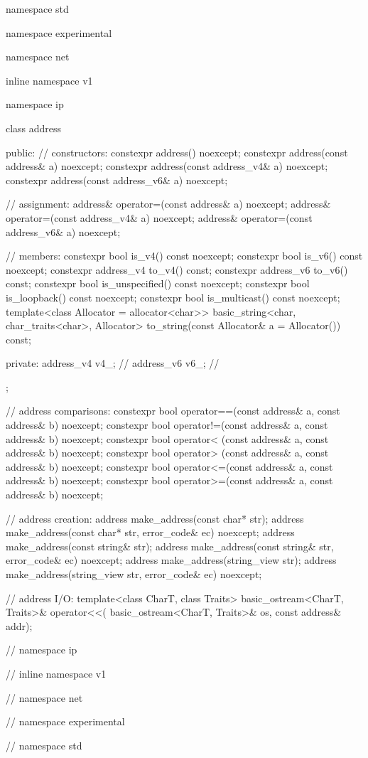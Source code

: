 %
%
%
%
%
%
%
%
%
\begin{codeblock}
namespace std {
namespace experimental {
namespace net {
inline namespace v1 {
namespace ip {

  class address
  {
  public:
    // constructors:
    constexpr address() noexcept;
    constexpr address(const address& a) noexcept;
    constexpr address(const address_v4& a) noexcept;
    constexpr address(const address_v6& a) noexcept;

    // assignment:
    address& operator=(const address& a) noexcept;
    address& operator=(const address_v4& a) noexcept;
    address& operator=(const address_v6& a) noexcept;

    // members:
    constexpr bool is_v4() const noexcept;
    constexpr bool is_v6() const noexcept;
    constexpr address_v4 to_v4() const;
    constexpr address_v6 to_v6() const;
    constexpr bool is_unspecified() const noexcept;
    constexpr bool is_loopback() const noexcept;
    constexpr bool is_multicast() const noexcept;
    template<class Allocator = allocator<char>>
      basic_string<char, char_traits<char>, Allocator>
        to_string(const Allocator& a = Allocator()) const;

  private:
    address_v4 v4_; // \expos
    address_v6 v6_; // \expos
  };

  // address comparisons:
  constexpr bool operator==(const address& a, const address& b) noexcept;
  constexpr bool operator!=(const address& a, const address& b) noexcept;
  constexpr bool operator< (const address& a, const address& b) noexcept;
  constexpr bool operator> (const address& a, const address& b) noexcept;
  constexpr bool operator<=(const address& a, const address& b) noexcept;
  constexpr bool operator>=(const address& a, const address& b) noexcept;

  // address creation:
  address make_address(const char* str);
  address make_address(const char* str, error_code& ec) noexcept;
  address make_address(const string& str);
  address make_address(const string& str, error_code& ec) noexcept;
  address make_address(string_view str);
  address make_address(string_view str, error_code& ec) noexcept;

  // address I/O:
  template<class CharT, class Traits>
    basic_ostream<CharT, Traits>& operator<<(
      basic_ostream<CharT, Traits>& os, const address& addr);

} // namespace ip
} // inline namespace v1
} // namespace net
} // namespace experimental
} // namespace std
\end{codeblock}

